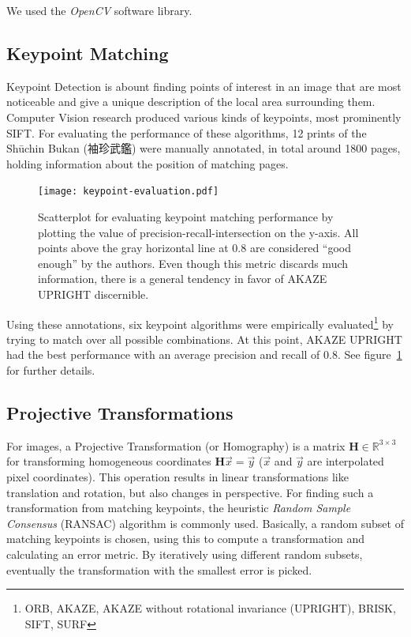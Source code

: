 \documentclass{ltjarticle}
\begin{document}
We used the \emph{OpenCV} software library.\cite{opencv_library}

\subsection{Keypoint Matching}

Keypoint Detection\cite[Ch.4]{szeliski2010computer} is abount finding points of interest in an image that are most noticeable and give a unique description of the local area surrounding them. Computer Vision research produced various kinds of keypoints, most prominently SIFT.\cite{lowe2004sift} For evaluating the performance of these algorithms, 12 prints of the Shūchin Bukan (袖珍武鑑) were manually annotated, in total around 1800 pages, holding information about the position of matching pages.

\begin{figure}[p]
    \centering
    \texttt{[image: keypoint-evaluation.pdf]}
    \caption[Scatterplot of keypoint matching performance]{Scatterplot for evaluating keypoint matching performance by plotting the value of precision-recall-intersection on the y-axis. All points above the gray horizontal line at $0.8$ are considered “good enough” by the authors. Even though this metric discards much information, there is a general tendency in favor of AKAZE UPRIGHT discernible.}
    \label{fig:keypoint-evaluation}
\end{figure}

Using these annotations, six keypoint algorithms were empirically evaluated\footnote{ORB\cite{rublee2011orb}, AKAZE\cite{alcantarilla2011fast}, AKAZE without rotational invariance (UPRIGHT), BRISK\cite{leutenegger2011brisk}, SIFT, SURF\cite{bay2006surf}} by trying to match over all possible combinations. At this point, AKAZE UPRIGHT had the best performance with an average precision and recall of $0.8$. See figure~\ref{fig:keypoint-evaluation} for further details.

\subsection{Projective Transformations}

For images, a Projective Transformation (or Homography) is a matrix $\mathbf{H} \in \mathbb{R}^{3 \times 3}$ for transforming homogeneous coordinates $\mathbf{H}\vec{x} = \vec{y}$ ($\vec{x}$ and $\vec{y}$ are interpolated pixel coordinates). This operation results in linear transformations like translation and rotation, but also changes in perspective.\cite{marschner2015fundamentals} For finding such a transformation from matching keypoints, the heuristic \emph{Random Sample Consensus} (RANSAC) algorithm is commonly used.\cite{fischler1981random} Basically, a random subset of matching keypoints is chosen, using this to compute a transformation and calculating an error metric. By iteratively using different random subsets, eventually the transformation with the smallest error is picked.
\end{document}
